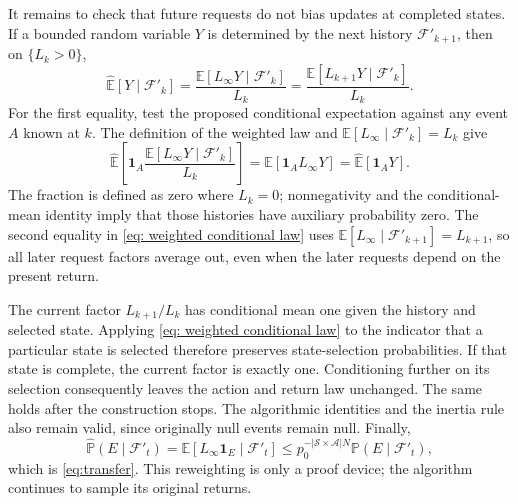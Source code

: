 It remains to check that future requests do not bias updates at completed states. If a bounded random variable $Y$ is determined by the next history $\mathcal F'_{k+1}$, then on $\{L_k>0\}$,
\begin{equation}
\label{eq: weighted conditional law}
\widehat{\mathbb E}[Y\mid\mathcal F'_k]
=\frac{\mathbb E[L_\infty Y\mid\mathcal F'_k]}{L_k}
=\frac{\mathbb E[L_{k+1}Y\mid\mathcal F'_k]}{L_k}.
\end{equation}
For the first equality, test the proposed conditional expectation against any event $A$ known at $k$. The definition of the weighted law and $\mathbb E[L_\infty\mid\mathcal F'_k]=L_k$ give
\[
\widehat{\mathbb E}\!\left[\mathbf1_A
\frac{\mathbb E[L_\infty Y\mid\mathcal F'_k]}{L_k}\right]
=\mathbb E[\mathbf1_A L_\infty Y]
=\widehat{\mathbb E}[\mathbf1_A Y].
\]
The fraction is defined as zero where $L_k=0$; nonnegativity and the conditional-mean identity imply that those histories have auxiliary probability zero. The second equality in \eqref{eq: weighted conditional law} uses $\mathbb E[L_\infty\mid\mathcal F'_{k+1}]=L_{k+1}$, so all later request factors average out, even when the later requests depend on the present return.

The current factor $L_{k+1}/L_k$ has conditional mean one given the history and selected state. Applying \eqref{eq: weighted conditional law} to the indicator that a particular state is selected therefore preserves state-selection probabilities. If that state is complete, the current factor is exactly one. Conditioning further on its selection consequently leaves the action and return law unchanged. The same holds after the construction stops. The algorithmic identities and the inertia rule also remain valid, since originally null events remain null.
Finally,
\[
\widehat{\mathbb P}(E\mid\mathcal F'_t)
=\mathbb E[L_\infty\mathbf1_E\mid\mathcal F'_t]
\le p_0^{-|\mathcal S\times\mathcal A|N}\mathbb P(E\mid\mathcal F'_t),
\]
which is \eqref{eq:transfer}. This reweighting is only a proof device; the algorithm continues to sample its original returns.
\hfill\BlackBox

